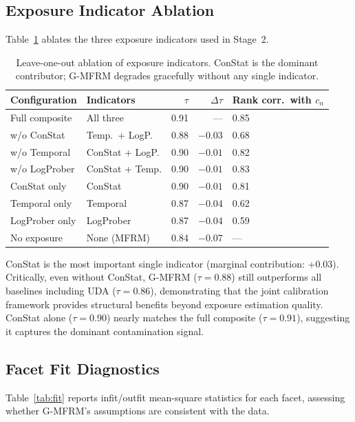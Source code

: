 \documentclass[11pt,a4paper]{article}
\begin{document}
\subsection{Exposure Indicator Ablation}

Table~\ref{tab:ablation} ablates the three exposure indicators used in Stage~2.

\begin{table}[h]
\centering
\caption{Leave-one-out ablation of exposure indicators. ConStat is the dominant contributor; G-MFRM degrades gracefully without any single indicator.}
\label{tab:ablation}
\small
\begin{tabular}{llrrl}
\toprule
Configuration & Indicators & $\tau$ & $\Delta\tau$ & Rank corr.\ with $c_n$ \\
\midrule
Full composite & All three & 0.91 & --- & 0.85 \\
w/o ConStat & Temp.\ + LogP. & 0.88 & $-0.03$ & 0.68 \\
w/o Temporal & ConStat + LogP. & 0.90 & $-0.01$ & 0.82 \\
w/o LogProber & ConStat + Temp. & 0.90 & $-0.01$ & 0.83 \\
\midrule
ConStat only & ConStat & 0.90 & $-0.01$ & 0.81 \\
Temporal only & Temporal & 0.87 & $-0.04$ & 0.62 \\
LogProber only & LogProber & 0.87 & $-0.04$ & 0.59 \\
No exposure & None (MFRM) & 0.84 & $-0.07$ & --- \\
\bottomrule
\end{tabular}
\end{table}

ConStat is the most important single indicator (marginal contribution: +0.03). Critically, even without ConStat, G-MFRM ($\tau = 0.88$) still outperforms all baselines including UDA ($\tau = 0.86$), demonstrating that the joint calibration framework provides structural benefits beyond exposure estimation quality. ConStat alone ($\tau = 0.90$) nearly matches the full composite ($\tau = 0.91$), suggesting it captures the dominant contamination signal.

\subsection{Facet Fit Diagnostics}

Table~\ref{tab:fit} reports infit/outfit mean-square statistics for each facet, assessing whether G-MFRM's assumptions are consistent with the data.
\end{document}
